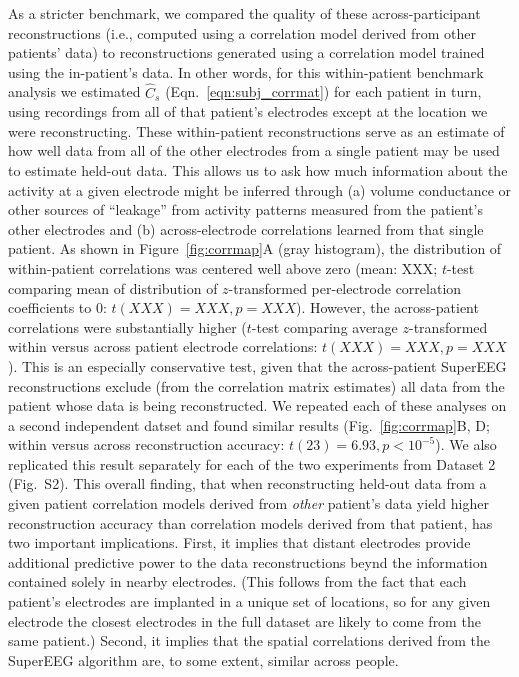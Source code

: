\documentclass[11pt]{article}
\newcommand{\perexpcorrmaps}{S2}
\begin{document}
As a stricter benchmark, we compared the quality of these
across-participant reconstructions (i.e., computed using a correlation
model derived from other patients' data) to reconstructions generated
using a correlation model trained using the in-patient's data.  In
other words, for this within-patient benchmark analysis we estimated
$\hat{C}_{s}$ (Eqn.~\ref{eqn:subj_corrmat}) for each patient in turn,
using recordings from all of that patient's electrodes except at the
location we were reconstructing.  These within-patient reconstructions
serve as an estimate of how well data from all of the other electrodes
from a single patient may be used to estimate held-out data.  This
allows us to ask how much information about the activity at a given
electrode might be inferred through (a) volume conductance or other
sources of ``leakage'' from activity patterns measured from the
patient's other electrodes and (b) across-electrode correlations
learned from that single patient.  As shown in
Figure~\ref{fig:corrmap}A (gray histogram), the distribution of
within-patient correlations was centered well above zero (mean: XXX;
$t$-test comparing mean of distribution of $z$-transformed
per-electrode correlation coefficients to 0: $t(XXX) = XXX, p = XXX$).
However, the across-patient correlations were substantially higher
($t$-test comparing average $z$-transformed within versus across
patient electrode correlations: $t(XXX) = XXX, p = XXX$).  This is an
especially conservative test, given that the across-patient SuperEEG
reconstructions exclude (from the correlation matrix estimates) all
data from the patient whose data is being reconstructed.  We repeated
each of these analyses on a second independent datset and found
similar results (Fig.~\ref{fig:corrmap}B, D; within versus across
reconstruction accuracy: $t(23) = 6.93, p < 10^{-5}$). We also
replicated this result separately for each of the two experiments from
Dataset 2 (Fig.~\perexpcorrmaps).  This overall finding,
that when reconstructing held-out data from a given patient
correlation models derived from \textit{other} patient's data yield
higher reconstruction accuracy than correlation models derived from
that patient, has two important implications.  First, it implies that
distant electrodes provide additional predictive power to the data
reconstructions beynd the information contained solely in nearby
electrodes.  (This follows from the fact that each patient's
electrodes are implanted in a unique set of locations, so for any
given electrode the closest electrodes in the full dataset are likely
to come from the same patient.)  Second, it implies that the spatial
correlations derived from the SuperEEG algorithm are, to some extent,
similar across people.
\end{document}
